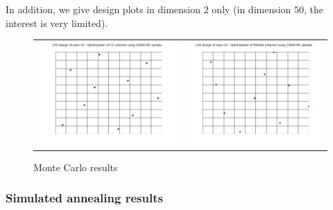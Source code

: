 In addition, we give design plots in dimension $2$ only (in dimension $50$, the interest is very limited).\\
\begin{figure}[!h]
\begin{center}
\begin{tabular}{cc}
 \includegraphics[scale=0.35]{lhs_mc_c2_10.png} & \includegraphics[scale=0.35]{lhs_mc_mindist_10.png}
\end{tabular}
\end{center}
\caption{Monte Carlo results}
\label{mc_graph_results}
\end{figure}


\subsubsection{Simulated annealing results}

